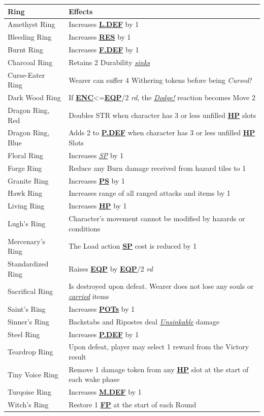 \documentclass[12pt]{article}
\newcommand{\refto}[1]{\hyperlink{#1}{\textbf{#1}}}
\newcommand{\reftoit}[1]{\hyperlink{#1}{\emph{#1}}}
\begin{document}
\begin{center}
\begin{tabularx}{\textwidth}{p{}p{}}
\hline
\rowcolor{white} \textbf{Ring} & \textbf{Effects}\setcounter{rownum}{0}\\
\hline
Amethyst Ring & Increases \refto{L.DEF} by 1\\
Bleeding Ring & Increases \refto{RES} by 1\\
Burnt Ring & Increases \refto{F.DEF} by 1 \\
Charcoal Ring & Retains 2 Durability \reftoit{sinks} \\
Curse-Eater Ring & Wearer can suffer 4 Withering tokens before being \emph{Cursed!}\\
Dark Wood Ring & If \refto{ENC}<=\refto{EQP}/2 \emph{rd}, the \reftoit{Dodge!} reaction becomes Move 2 \\
Dragon Ring, Red & Doubles STR when character has 3 or less unfilled \refto{HP} slots \\
Dragon Ring, Blue & Adds 2 to \refto{P.DEF} when character has 3 or less unfilled \refto{HP} Slots \\
Floral Ring & Increases \reftoit{SP} by 1 \\
Forge Ring & Reduce any Burn damage received from hazard tiles to 1 \\
Granite Ring & Increases \refto{PS} by 1 \\
Hawk Ring & Increases range of all ranged attacks and items by 1\\
Living Ring & Increases \refto{HP} by 1 \\
Lugh’s Ring & Character’s movement cannot be modified by hazards or conditions\\
Mercenary’s Ring & The Load action \refto{SP} cost is reduced by 1 \\
Standardized Ring & Raises \refto{EQP} by \refto{EQP}/2 \emph{rd} \\
Sacrifical Ring & Is destroyed upon defeat. Wearer does not lose any souls or \reftoit{carried} items\\
Saint’s Ring & Increases \refto{POTs} by 1\\
Sinner’s Ring & Backstabs and Ripostes deal \reftoit{Unsinkable} damage \\
Steel Ring & Increases \refto{P.DEF} by 1 \\
Teardrop Ring & Upon defeat, player may select 1 reward from the Victory result\\
Tiny Voice Ring & Remove 1 damage token from any \refto{HP} slot at the start of each wake phase \\
Turqoise Ring & Increases \refto{M.DEF} by 1\\
Witch’s Ring & Restore 1 \refto{FP} at the start of each Round\\
\hline
\end{tabularx}
\end{center}
\end{document}
